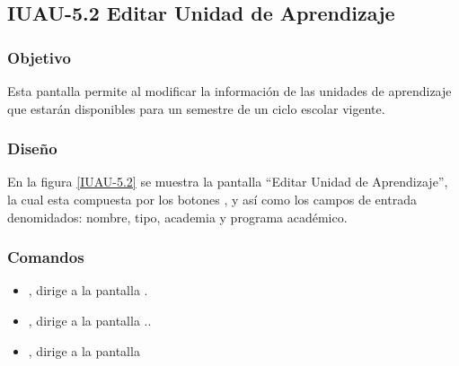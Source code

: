 \subsection{IUAU-5.2 Editar Unidad de Aprendizaje}

\subsubsection{Objetivo}

	
    Esta pantalla permite al  modificar la información de las unidades de aprendizaje que estarán disponibles para un semestre de un ciclo escolar vigente.
\subsubsection{Diseño}


    En la figura \ref{IUAU-5.2} se muestra la pantalla ``Editar Unidad de Aprendizaje'', la cual esta compuesta por los botones  ,  y  así como los campos de entrada denomidados: nombre, tipo, academia y programa académico.
     



\subsubsection{Comandos}
    \begin{itemize}
	\item {}, dirige a la pantalla .
	\item {}, dirige a la pantalla ..
	\item {}, dirige a la pantalla 
    \end{itemize}
